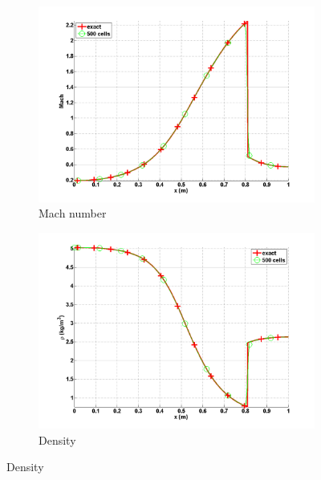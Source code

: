 \documentclass[review,10pt]{elsarticle}
\begin{document}
\begin{figure}[H]
        \centering
        \begin{subfigure}[b]{0.495\textwidth}
                \centering
                \includegraphics[width=\textwidth]{figures/vapor_mach_numerical_and_exact_500.png}
                \caption{Mach number}
                \label{fig:1d_nozzle_vap_vel}
        \end{subfigure}%
        \begin{subfigure}[b]{0.495\textwidth}
                \centering
                \includegraphics[width=\textwidth]{figures/vapor_density_numerical_and_exact_500.png}
                \caption{Density}
                \label{fig:1d_nozzle_vap_density}
        \end{subfigure}


\end{figure}
\end{document}
